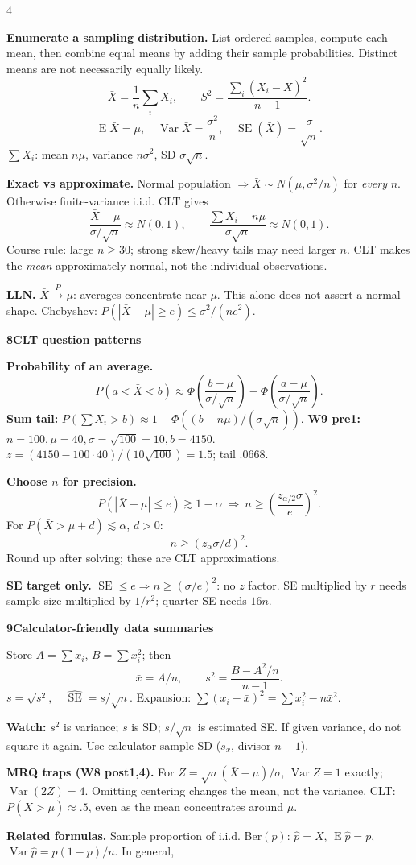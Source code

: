 \documentclass[a4paper,landscape]{article}
\newcommand{\head}[2][late]{\par\vspace{3pt}\noindent\colorbox{#1}{\parbox{\dimexpr\linewidth-6pt}{\color{white}\bfseries #2}}\par\vspace{1pt}}
\newcommand{\cue}[1]{\par\textbf{#1}\enspace}
\newcommand{\trap}[1]{\par{\color{alert}\textbf{Watch:} #1}}
\newcommand{\E}{\operatorname{E}}
\newcommand{\V}{\operatorname{Var}}
\newcommand{\SE}{\operatorname{SE}}
\newcommand{\xb}{\bar x}
\newcommand{\Xb}{\bar X}
\begin{document}
\begin{multicols*}{4}
\cue{Enumerate a sampling distribution.} List ordered samples, compute each mean, then combine equal means by adding their sample probabilities. Distinct means are not necessarily equally likely.
\[\Xb=\frac1n\sum_iX_i,\qquad
 S^2=\frac{\sum_i(X_i-\Xb)^2}{n-1}.\]
\[\E\Xb=\mu,\quad\V\Xb=\frac{\sigma^2}{n},\quad
 \SE(\Xb)=\frac{\sigma}{\sqrt n}.\]
\(\sum X_i\): mean \(n\mu\), variance \(n\sigma^2\), SD \(\sigma\sqrt n\).
\cue{Exact vs approximate.} Normal population \(\Rightarrow\Xb\sim N(\mu,\sigma^2/n)\) for \emph{every} \(n\). Otherwise finite-variance i.i.d. CLT gives
\[\frac{\Xb-\mu}{\sigma/\sqrt n}\approx N(0,1),\qquad
 \frac{\sum X_i-n\mu}{\sigma\sqrt n}\approx N(0,1).\]
Course rule: large \(n\ge30\); strong skew/heavy tails may need larger \(n\). CLT makes the \emph{mean} approximately normal, not the individual observations.
\cue{LLN.} \(\Xb\xrightarrow{P}\mu\): averages concentrate near \(\mu\). This alone does not assert a normal shape. Chebyshev: \(P(|\Xb-\mu|\ge e)\le\sigma^2/(ne^2)\).
\head{8\quad CLT question patterns}
\cue{Probability of an average.}
\[P(a<\Xb<b)\approx
 \Phi\!\left(\frac{b-\mu}{\sigma/\sqrt n}\right)
 -\Phi\!\left(\frac{a-\mu}{\sigma/\sqrt n}\right).\]
\textbf{Sum tail:} \(P(\sum X_i>b)\approx1-\Phi((b-n\mu)/(\sigma\sqrt n))\). \textbf{W9 pre1:} \(n=100,\mu=40,\sigma=\sqrt{100}=10,b=4150\). \(z=(4150-100\cdot40)/(10\sqrt{100})=1.5\); tail \(.0668\).
\cue{Choose \(n\) for precision.}
\[P(|\Xb-\mu|\le e)\gtrsim1-\alpha
 \ \Longrightarrow\ n\ge\left(\frac{z_{\alpha/2}\sigma}{e}\right)^2.\]
For \(P(\Xb>\mu+d)\lesssim\alpha\), \(d>0\):
\[n\ge(z_\alpha\sigma/d)^2.\]
Round up after solving; these are CLT approximations.
\cue{SE target only.} \(\SE\le e\Rightarrow n\ge(\sigma/e)^2\): no \(z\) factor. SE multiplied by \(r\) needs sample size multiplied by \(1/r^2\); quarter SE needs \(16n\).
\head{9\quad Calculator-friendly data summaries}
Store \(A=\sum x_i\), \(B=\sum x_i^2\); then
\[\xb=A/n,\qquad s^2=\frac{B-A^2/n}{n-1}.\]
\(s=\sqrt{s^2},\quad\widehat{\SE}=s/\sqrt n\).
Expansion: \(\sum(x_i-\xb)^2=\sum x_i^2-n\xb^2\).
\trap{\(s^2\) is variance; \(s\) is SD; \(s/\sqrt n\) is estimated SE. If given variance, do not square it again. Use calculator sample SD (\(s_x\), divisor \(n-1\)).}
\cue{MRQ traps (W8 post1,4).} For \(Z=\sqrt n(\Xb-\mu)/\sigma\), \(\V Z=1\) exactly; \(\V(2Z)=4\). Omitting centering changes the mean, not the variance. CLT: \(P(\Xb>\mu)\approx.5\), even as the mean concentrates around \(\mu\).
\cue{Related formulas.} Sample proportion of i.i.d. Ber\((p)\): \(\hat p=\Xb\), \(\E\hat p=p\), \(\V\hat p=p(1-p)/n\). In general,

\end{multicols*}
\end{document}
